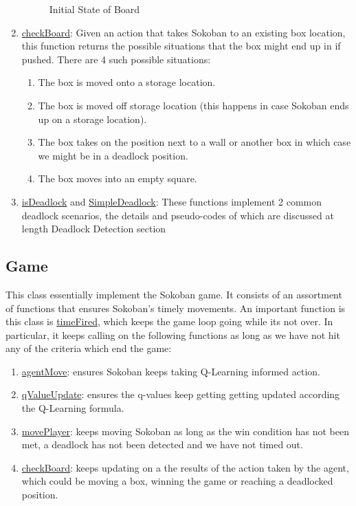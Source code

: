 \documentclass{article}
\begin{document}
\begin{enumerate}[label=\alph*)]
\begin{figure}[htp]
        \caption{Initial State of Board}
\end{figure} 
    \item \underline{checkBoard}: Given an action that takes Sokoban to an existing box location, this function returns the possible situations that the box might end up in if pushed. There are 4 such possible situations:
    
    \begin{enumerate}[label=\arabic*)]
        \item The box is moved onto a storage location. 
        \item The box is moved off storage location (this happens in case Sokoban ends up on a storage location).
        \item The box takes on the position next to a wall or another box in which case we might be in a deadlock position.
        \item The box moves into an empty square. 
    \end{enumerate}
    
    \item \underline{isDeadlock} and \underline{SimpleDeadlock}: These functions implement 2 common deadlock scenarios, the details and pseudo-codes of which are discussed at length Deadlock Detection section 
\end{enumerate}

\subsection{Game}
This class essentially implement the Sokoban game. It consists of an assortment of functions that ensures Sokoban's timely movements. An important function is this class is \underline{timeFired}, which keeps the game loop going while its not over. In particular, it keeps calling on the following functions as long as we have not hit any of the criteria which end the game: 

\begin{enumerate}[label=\alph*)]
    \item \underline{agentMove}: ensures Sokoban keeps taking Q-Learning informed action.
    \item \underline{qValueUpdate}: ensures the q-values keep getting getting updated according the Q-Learning formula. 
    \item \underline{movePlayer}: keeps moving Sokoban as long as the win condition has not been met, a deadlock has not been detected and we have not timed out.
    \item \underline{checkBoard}: keeps updating on a the results of the action taken by the agent, which could be moving a box, winning the game or reaching a deadlocked position.
\end{enumerate}
\end{document}
